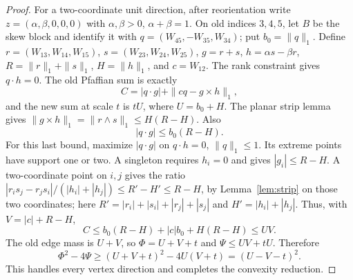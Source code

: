 \documentclass[11pt]{article}
\begin{document}
\begin{proof}
For a two-coordinate unit direction, after reorientation write $z=(\alpha,\beta,0,0,0)$ with $\alpha,\beta>0$, $\alpha+\beta=1$. On old indices $3,4,5$, let $B$ be the skew block and identify it with $q=(W_{45},-W_{35},W_{34})$; put $b_0=\|q\|_1$. Define $r=(W_{13},W_{14},W_{15})$, $s=(W_{23},W_{24},W_{25})$, $g=r+s$, $h=\alpha s-\beta r$, $R=\|r\|_1+\|s\|_1$, $H=\|h\|_1$, and $c=W_{12}$. The rank constraint gives $q\cdot h=0$. The old Pfaffian sum is exactly
\[
 C=|q\cdot g|+\|cq-g\times h\|_1,
\]
and the new sum at scale $t$ is $tU$, where $U=b_0+H$. The planar strip lemma gives $\|g\times h\|_1=\|r\wedge s\|_1\leq H(R-H)$. Also
\[
                        |q\cdot g|\leq b_0(R-H).
\]
For this last bound, maximize $|q\cdot g|$ on $q\cdot h=0$, $\|q\|_1\leq1$. Its extreme points have support one or two. A singleton requires $h_i=0$ and gives $|g_i|\leq R-H$. A two-coordinate point on $i,j$ gives the ratio
$|r_i s_j-r_j s_i|/(|h_i|+|h_j|)\leq R'-H'\leq R-H$, by Lemma~\ref{lem:strip} on those two coordinates; here $R'=|r_i|+|s_i|+|r_j|+|s_j|$ and $H'=|h_i|+|h_j|$. Thus, with $V=|c|+R-H$,
\[
 C\leq b_0(R-H)+|c|b_0+H(R-H)\leq UV.
\]
The old edge mass is $U+V$, so $\Phi=U+V+t$ and $\Psi\leq UV+tU$. Therefore
\[
 \Phi^2-4\Psi\geq(U+V+t)^2-4U(V+t)=(U-V-t)^2.
\]
This handles every vertex direction and completes the convexity reduction.
\end{proof}
\end{document}
